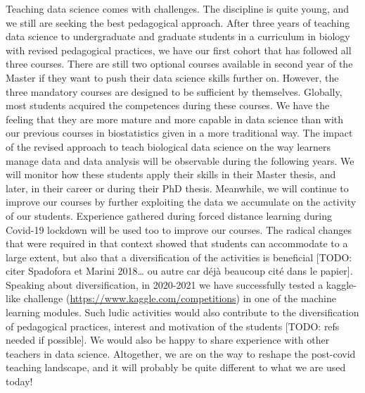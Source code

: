 \documentclass{aims}
\theoremstyle{definition}
\begin{document}
Teaching data science comes with challenges. The discipline is quite
young, and we still are seeking the best pedagogical approach. After
three years of teaching data science to undergraduate and graduate
students in a curriculum in biology with revised pedagogical practices,
we have our first cohort that has followed all three courses. There are
still two optional courses available in second year of the Master if
they want to push their data science skills further on. However, the
three mandatory courses are designed to be sufficient by themselves.
Globally, most students acquired the competences during these courses.
We have the feeling that they are more mature and more capable in data
science than with our previous courses in biostatistics given in a more
traditional way. The impact of the revised approach to teach biological
data science on the way learners manage data and data analysis will be
observable during the following years. We will monitor how these
students apply their skills in their Master thesis, and later, in their
career or during their PhD thesis. Meanwhile, we will continue to
improve our courses by further exploiting the data we accumulate on the
activity of our students. Experience gathered during forced distance
learning during Covid-19 lockdown will be used too to improve our
courses. The radical changes that were required in that context showed
that students can accommodate to a large extent, but also that a
diversification of the activities is beneficial {[}TODO: citer Spadofora
et Marini 2018\ldots{} ou autre car déjà beaucoup cité dans le
papier{]}. Speaking about diversification, in 2020-2021 we have
successfully tested a kaggle-like challenge
(\url{https://www.kaggle.com/competitions}) in one of the machine
learning modules. Such ludic activities would also contribute to the
diversification of pedagogical practices, interest and motivation of the
students {[}TODO: refs needed if possible{]}. We would also be happy to
share experience with other teachers in data science. Altogether, we are
on the way to reshape the post-covid teaching landscape, and it will
probably be quite different to what we are used today!

\end{document}
